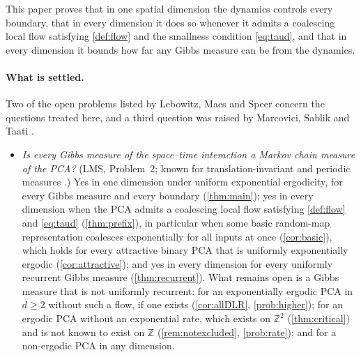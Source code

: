 \documentclass[11pt]{article}
\theoremstyle{plain}
\theoremstyle{definition}
\theoremstyle{remark}
\newcommand{\Z}{\mathbb{Z}}
\begin{document}
This paper proves that in one spatial dimension the dynamics controls every boundary, that in every dimension it does so whenever it admits a coalescing local flow satisfying \cref{def:flow} and the smallness condition \eqref{eq:taud}, and that in every dimension it bounds how far any Gibbs measure can be from the dynamics.

\paragraph{What is settled.} Two of the open problems listed by Lebowitz, Maes and Speer \cite[Section~6.6]{LMS90} concern the questions treated here, and a third question was raised by Marcovici, Sablik and Taati \cite[Section~2.2]{MSTaati19}.
\begin{itemize}
\item \emph{Is every Gibbs measure of the space--time interaction a Markov chain measure of the PCA?} (LMS, Problem~2; known for translation-invariant and periodic measures \cite{GKLM89}.) Yes in one dimension under uniform exponential ergodicity, for every Gibbs measure and every boundary (\cref{thm:main}); yes in every dimension when the PCA admits a coalescing local flow satisfying \cref{def:flow} and \eqref{eq:taud} (\cref{thm:prefix}), in particular when some basic random-map representation coalesces exponentially for all inputs at once (\cref{cor:basic}), which holds for every attractive binary PCA that is uniformly exponentially ergodic (\cref{cor:attractive}); and yes in every dimension for every uniformly recurrent Gibbs measure (\cref{thm:recurrent}). What remains open is a Gibbs measure that is not uniformly recurrent: for an exponentially ergodic PCA in $d\ge2$ without such a flow, if one exists (\cref{cor:allDLR}, \cref{prob:higher}); for an ergodic PCA without an exponential rate, which exists on $\Z^2$ (\cref{thm:critical}) and is not known to exist on $\Z$ (\cref{rem:notexcluded}, \cref{prob:rate}); and for a non-ergodic PCA in any dimension.

\end{itemize}
\end{document}
